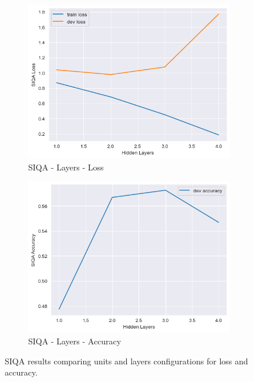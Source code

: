 \documentclass[12pt]{article}
\theoremstyle{definitionstyle}
\begin{document}
\begin{enumerate}
\begin{figure}[h!]
            \begin{subfigure}{0.45\textwidth}
                \includegraphics[width=\textwidth]{images/siqa_layers_loss.png}
                \caption{SIQA - Layers - Loss}
            \end{subfigure}
            \hfill
            \begin{subfigure}{0.45\textwidth}
                \includegraphics[width=\textwidth]{images/siqa_layers_acc.png}
                \caption{SIQA - Layers - Accuracy}
            \end{subfigure}
        
            \caption{SIQA results comparing units and layers configurations for loss and accuracy.}
            \label{fig:siqa_results}
        \end{figure}


\end{enumerate}
\end{document}
